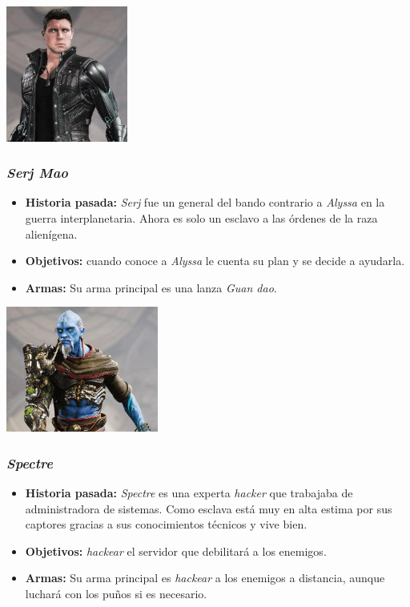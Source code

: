 \documentclass[11pt, twoside]{article}
\begin{document}
\begin{center}
\includegraphics[width=4cm]{./images/morten.jpg}
\end{center}

\subsubsection{\textit{Serj Mao}}
\begin{itemize}
\item \textbf{Historia pasada:} \textit{Serj} fue un general del bando contrario a \textit{Alyssa} en la guerra interplanetaria. Ahora es solo un esclavo a las órdenes de la raza alienígena.
\item \textbf{Objetivos:} cuando conoce a \textit{Alyssa} le cuenta su plan y se decide a ayudarla. 
\item \textbf{Armas:} Su arma principal es una lanza \textit{Guan dao}.
\end{itemize}

\pagestyle{notsection}

\begin{center}
\includegraphics[width=5cm]{./images/serj.jpg}
\end{center}

\subsubsection{\textit{Spectre}}
\begin{itemize}
\item \textbf{Historia pasada:} \textit{Spectre} es una experta \textit{hacker} que trabajaba de administradora de sistemas. Como esclava está muy en alta estima por sus captores gracias a sus conocimientos técnicos y vive bien. 
\item \textbf{Objetivos:} \textit{hackear} el servidor que debilitará a los enemigos.
\item \textbf{Armas:} Su arma principal es \textit{hackear} a los enemigos a distancia, aunque luchará con los puños si es necesario.
\end{itemize}
\end{document}

